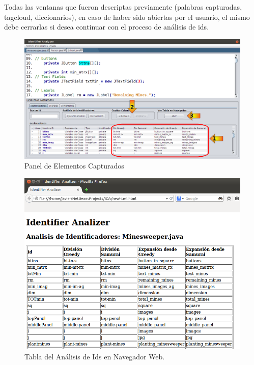 Todas las ventanas que fueron descriptas previamente (palabras capturadas, tagcloud, diccionarios), en caso de haber sido abiertas por el usuario, el mismo debe cerrarlas si desea continuar con el proceso de análisis de ids.

\begin{figure}[t!] %
\centerline{%
\includegraphics[scale= 0.42]{./cap4/ida_10.png}
}
\caption{Panel de Elementos Capturados}
\label{ida10}
\end{figure}


\begin{figure}[t] %
\centerline{%
\includegraphics[scale= 0.63]{./cap4/ida_11.png}
}
\caption{Tabla del Análisis de Ids en Navegador Web.}
\label{ida11}
\end{figure}

